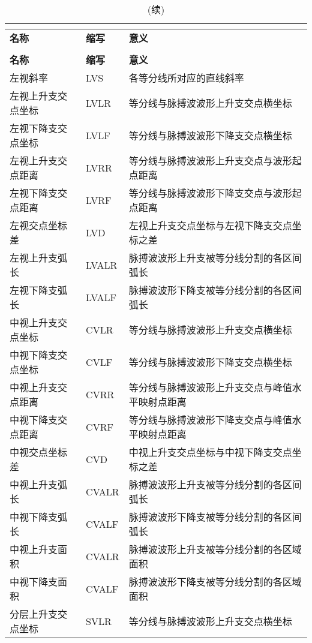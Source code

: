 \begin{center}
  \begin{longtable}{m{4cm}<{\centering}m{2cm}<{\centering}m{8.5cm}<{\centering}}
    \caption{本研究使用的所有PPG时域指标一览}\\
    \label{tab:PPGinPE}\\
        \toprule
        \textbf{名称}&\textbf{缩写}&\textbf{意义}\\
        \midrule
        \endfirsthead
        \caption[]{(续)}\\
        \midrule
        \textbf{名称}&\textbf{缩写}&\textbf{意义}\\
        \midrule
        \endhead 
        \midrule
        \endfoot
        \bottomrule
        \endlastfoot
        左视斜率    &   LVS    &   各等分线所对应的直线斜率   \\
        左视上升支交点坐标 & LVLR & 等分线与脉搏波波形上升支交点横坐标 \\
        左视下降支交点坐标 & LVLF & 等分线与脉搏波波形下降支交点横坐标 \\
        左视上升支交点距离 & LVRR & 等分线与脉搏波波形上升支交点与波形起点距离 \\
        左视下降支交点距离 & LVRF & 等分线与脉搏波波形下降支交点与波形起点距离 \\
        左视交点坐标差 & LVD & 左视上升支交点坐标与左视下降支交点坐标之差 \\
        左视上升支弧长 & LVALR & 脉搏波波形上升支被等分线分割的各区间弧长 \\
        左视下降支弧长 & LVALF & 脉搏波波形下降支被等分线分割的各区间弧长 \\
        中视上升支交点坐标 & CVLR & 等分线与脉搏波波形上升支交点横坐标 \\
        中视下降支交点坐标 & CVLF & 等分线与脉搏波波形下降支交点横坐标 \\
        中视上升支交点距离 & CVRR & 等分线与脉搏波波形上升支交点与峰值水平映射点距离 \\
        中视下降支交点距离 & CVRF & 等分线与脉搏波波形下降支交点与峰值水平映射点距离 \\
        中视交点坐标差 & CVD & 中视上升支交点坐标与中视下降支交点坐标之差 \\
        中视上升支弧长 & CVALR & 脉搏波波形上升支被等分线分割的各区间弧长 \\
        中视下降支弧长 & CVALF & 脉搏波波形下降支被等分线分割的各区间弧长 \\
        中视上升支面积 & CVALR & 脉搏波波形上升支被等分线分割的各区域面积 \\
        中视下降支面积 & CVALF & 脉搏波波形下降支被等分线分割的各区域面积 \\
        分层上升支交点坐标 & SVLR & 等分线与脉搏波波形上升支交点横坐标 \\
  \end{longtable}
\end{center}




